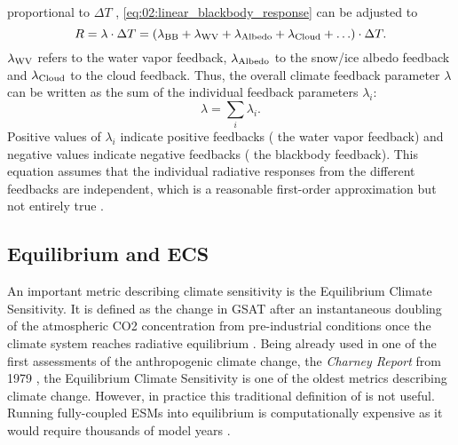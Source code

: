 proportional to $\Delta T$ \autocite{Gregory2008a},
\cref{eq:02:linear_blackbody_response} can be adjusted to
\begin{equation}
  R = \lambda \cdot \Delta T = \left( \lambda_\textnormal{BB} +
  \lambda_\textnormal{WV} + \lambda_\textnormal{Albedo} + \lambda_\textnormal{Cloud} +
  \ldots \right) \cdot \Delta T.
  \label{eq:02:linear_response}
\end{equation}
$\lambda_\textnormal{WV}$ refers to the water vapor feedback,
$\lambda_\textnormal{Albedo}$ to the snow/ice albedo feedback and
$\lambda_\textnormal{Cloud}$ to the cloud feedback. Thus, the overall climate
feedback parameter $\lambda$ can be written as the sum of the individual
feedback parameters $\lambda_i$:
\begin{equation}
  \lambda = \sum_i \lambda_i.
  \label{eq:02:lambda_as_sum_of_lambdas}
\end{equation}
Positive values of $\lambda_i$ indicate positive feedbacks (\eg{} the water
vapor feedback) and negative values indicate negative feedbacks (\eg{} the
blackbody feedback). This equation assumes that the individual radiative
responses from the different feedbacks are independent, which is a reasonable
first-order approximation but not entirely true \autocite{Soden2008}.

\subsection{Equilibrium and \acl{ECS}}
\label{subsec:02:ecs}

An important metric describing climate sensitivity is the Equilibrium Climate
Sensitivity. It is defined as the change in \ac{GSAT} after an instantaneous
doubling of the atmospheric \ac{CO2} concentration from pre-industrial
conditions once the climate system reaches radiative equilibrium
\autocite{Bindoff2013}. Being already used in one of the first assessments of
the anthropogenic climate change, the \emph{Charney Report} from 1979
\autocite{Charney1979}, the Equilibrium Climate Sensitivity is one of the
oldest metrics describing climate change. However, in practice this traditional
definition of is not useful. Running fully-coupled \acp{ESM} into equilibrium
is computationally expensive as it would require thousands of model years
\autocite{Rugenstein2020}.

